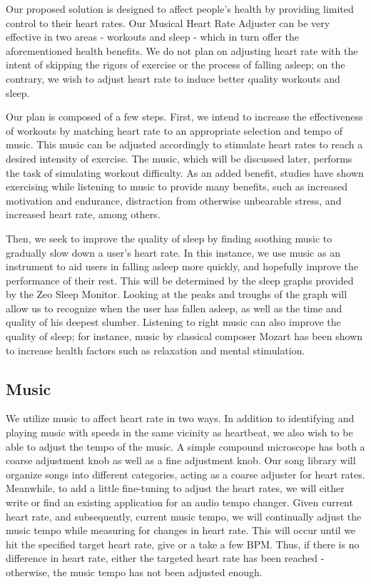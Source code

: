 \documentclass[letterpaper,english]{scrreprt}
\begin{document}
Our proposed solution is designed to affect people's health by providing limited control to their heart rates. Our Musical Heart Rate Adjuster can be very effective in two areas - workouts and sleep - which in turn offer the aforementioned health benefits. We do not plan on adjusting heart rate with the intent of skipping the rigors of exercise or the process of falling asleep; on the contrary, we wish to adjust heart rate to induce better quality workouts and sleep.
			 
Our plan is composed of a few steps. First, we intend to increase the effectiveness of workouts by matching heart rate to an appropriate selection and tempo of music. This music can be adjusted accordingly to stimulate heart rates to reach a desired intensity of exercise. The music, which will be discussed later, performs the task of simulating workout difficulty. As an added benefit, studies have shown exercising while listening to music to provide many benefits, such as increased motivation and endurance, distraction from otherwise unbearable stress, and increased heart rate, among others.
			 
Then, we seek to improve the quality of sleep by finding soothing music to gradually slow down a user's heart rate. In this instance, we use music as an instrument to aid users in falling asleep more quickly, and hopefully improve the performance of their rest. This will be determined by the sleep graphs provided by the Zeo Sleep Monitor. Looking at the peaks and troughs of the graph will allow us to recognize when the user has fallen asleep, as well as the time and quality of his deepest slumber. Listening to right music can also improve the quality of sleep; for instance, music by classical composer Mozart has been shown to increase health factors such as relaxation and mental stimulation.
			 
\subsection{Music}
We utilize music to affect heart rate in two ways. In addition to identifying and playing music with speeds in the same vicinity as heartbeat, we also wish to be able to adjust the tempo of the music. A simple compound microscope has both a coarse adjustment knob as well as a fine adjustment knob. Our song library will organize songs into different categories, acting as a coarse adjuster for heart rates. Meanwhile, to add a little fine-tuning to adjust the heart rates, we will either write or find an existing application for an audio tempo changer. Given current heart rate, and subsequently, current music tempo, we will continually adjust the music tempo while measuring for changes in heart rate. This will occur until we hit the specified target heart rate, give or a take a few BPM. Thus, if there is no difference in heart rate, either the targeted heart rate has been reached - otherwise,  the music tempo has not been adjusted enough.
			 
\end{document}
